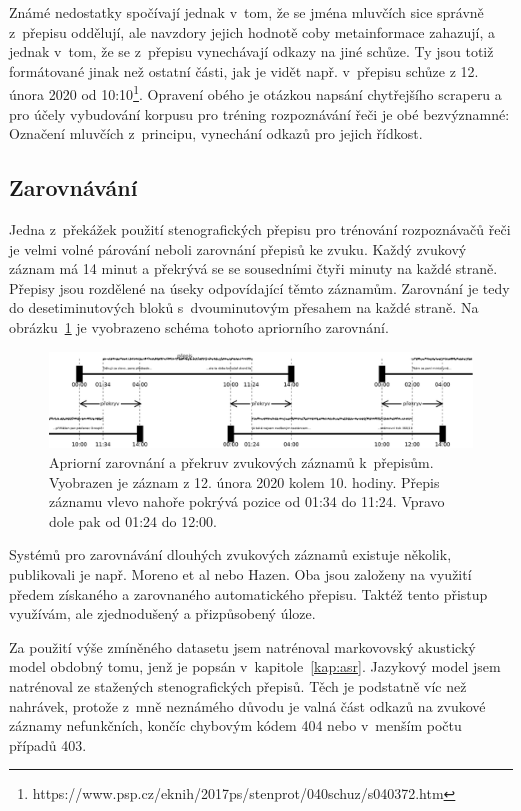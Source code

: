 Známé nedostatky spočívají jednak v~tom, že se jména mluvčích sice správně z~přepisu
oddělují, ale navzdory jejich hodnotě coby metainformace zahazují, a jednak
v~tom, že se z~přepisu vynechávají odkazy na jiné schůze. Ty jsou totiž
formátované jinak než ostatní části, jak je vidět např. v~přepisu schůze z 12.
února 2020 od
10:10\footnote{https://www.psp.cz/eknih/2017ps/stenprot/040schuz/s040372.htm}.
Opravení obého je otázkou napsání chytřejšího scraperu a pro účely vybudování
korpusu pro tréning rozpoznávání řeči je obé bezvýznamné: Označení mluvčích
z~principu, vynechání odkazů pro jejich řídkost.

\subsection{Zarovnávání}

Jedna z~překážek použití stenografických přepisu pro trénování rozpoznávačů řeči
je velmi volné párování neboli zarovnání přepisů ke zvuku. Každý zvukový záznam
má 14 minut a překrývá se se sousedními čtyři minuty na každé straně.
Přepisy jsou rozdělené na úseky odpovídající těmto záznamům. Zarovnání je tedy
do desetiminutových bloků s~dvouminutovým přesahem na každé straně. Na
obrázku~\ref{fig:svolocz:overlap} je vyobrazeno schéma tohoto apriorního
zarovnání.

\begin{figure}[htpb]
\includegraphics[scale=0.25]{rc/svolocz-overlap.eps}
\caption{Apriorní zarovnání a překruv zvukových záznamů k~přepisům. Vyobrazen je
záznam z 12. února 2020 kolem 10. hodiny. Přepis záznamu vlevo nahoře pokrývá
pozice od 01:34 do 11:24. Vpravo dole pak od 01:24 do 12:00.}
\label{fig:svolocz:overlap}
\end{figure}

Systémů pro zarovnávání dlouhých zvukových záznamů existuje několik, publikovali
je např. Moreno et al\cite{moreno1998recursive} nebo
Hazen\cite{hazen2006automatic}. Oba jsou založeny na využití předem získaného a
zarovnaného automatického přepisu. Taktéž tento přistup využívám, ale
zjednodušený a přizpůsobený úloze.

Za použití výše zmíněného datasetu\cite{pspdata} jsem natrénoval markovovský
akustický model obdobný tomu, jenž je popsán v~kapitole~\ref{kap:asr}. Jazykový
model jsem natrénoval ze stažených stenografických přepisů. Těch je podstatně
víc než nahrávek, protože z~mně neznámého důvodu je valná část odkazů na zvukové
záznamy nefunkčních, končíc chybovým kódem 404 nebo v~menším počtu případů 403.

